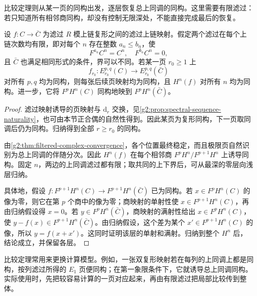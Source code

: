 \ProseParagraphBreak

比较定理则从某一页的同构出发，逐层恢复总上同调的同构。这里需要有限滤过：若只知道所有相邻商同构，却没有控制无限深处，不能直接完成最后的恢复。

\begin{theorem}\label{g2:thm:spectral-sequence-comparison}
	设 \(f:C\to\bar C\) 为滤过 \(R\) 模上链复形之间的滤过上链映射。假定两个滤过在每个上链次数均有限，即对每个 \(n\) 存在整数 \(a_n\le b_n\)，使
	\[
		F^{a_n}C^n=C^n,\quad F^{b_n}C^n=0,
	\]
	且 \(\bar C\) 也满足相同形式的条件，界可以不同。若某一页 \(r_0\ge1\) 上
	\[
		f_{r_0}:E_{r_0}^{p,q}(C)\longrightarrow E_{r_0}^{p,q}(\bar C)
	\]
	对所有 \(p,q\) 均为同构，则每张后续页映射均为同构，且 \(H^n(f)\) 对所有 \(n\) 均为同构。进一步，它将 \(F^pH^n(C)\) 同构地映到 \(F^pH^n(\bar C)\)。
\end{theorem}
\begin{proof}
	滤过映射诱导的页映射与 \(\mathrm d_r\) 交换，见\cref{g2:prop:spectral-sequence-naturality}，也可由本节正合偶的自然性得到。因此某页为复形同构，下一页取同调后仍为同构。归纳得到全部 \(r\ge r_0\) 的同构。

	由\cref{g2:thm:filtered-complex-convergence}，各个位置最终稳定，而且极限页自然识别为总上同调的伴随分次。因此 \(H^n(f)\) 在每个相邻商 \(F^pH^n/F^{p+1}H^n\) 上诱导同构。固定 \(n\)，两边的上同调滤过都有限；取共同的上下界后，可从最深的零层向浅层归纳。

	具体地，假设 \(f:F^{p+1}H^n(C)\to F^{p+1}H^n(\bar C)\) 已为同构。若 \(x\in F^pH^n(C)\) 的像为零，则它在第 \(p\) 个商中的像为零；商映射的单射性使 \(x\in F^{p+1}H^n(C)\)，再由归纳假设得 \(x=0\)。若 \(y\in F^pH^n(\bar C)\)，商映射的满射性给出 \(x\in F^pH^n(C)\)，使 \(y-f(x)\in F^{p+1}H^n(\bar C)\)。由归纳假设，这个差为某个 \(x'\in F^{p+1}H^n(C)\) 的像，所以 \(y=f(x+x')\)。这同时证明该层的单射和满射。归纳到整个 \(H^n\) 后，结论成立，并保留各层。
\end{proof}

比较定理常用来更换计算模型。例如，一张双复形映射若在每列的上同调上都是同构，按列滤过所得的 \(E_1\) 页便同构；在第一象限条件下，它就诱导总上同调同构。实际使用时，先把较容易计算的一页对应起来，再由有限滤过把局部比较传到整体。
